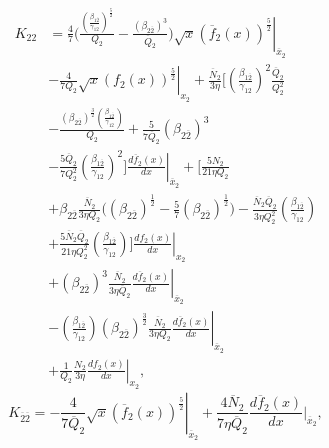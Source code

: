 \documentclass[final,3p,times,twocolumn]{elsarticle}
\begin{document}
           
            \begin{equation}
                \begin{split}
                          K_{22} &= \frac{4}{7} \biggl( \frac{\left(\frac{\beta_{1\overline{2}}}{\gamma_{12}}\right)^\frac{5}{2}}{Q_{2}} - \frac{\left(\beta_{2\overline{2}
                          }\right)^{3}}{\overline{Q}_{2}} \left. \biggr) \sqrt{x}  (\overline{f}_{2}(x))^\frac{5}{2} \right|_{\overline{x}_{2}} \\ & - \left. \frac{4}{7 Q_{2}} \sqrt{x} (f_{2}(x))^\frac{5}{2} \right|_{x_{2}}  + \frac{\overline{N}_{2}}{3 \eta} \biggl[\left(\frac{\beta_{1\overline{2}}}{\gamma_{12}}\right)^{2} \frac{\overline{Q}_{2}}{Q_{2}^{2}} \\ & - \frac{(\beta_{2\overline{2}})^\frac{3}{2} \left(\frac{\beta_{1\overline{2}}}{\gamma_{12}}\right)}{Q_{2}}   + \frac{5}{7 \overline{Q}_{2}} (\beta_{2\overline{2}})^{3}  \\ &  - \frac{5 \overline{Q}_{2}}{7 Q_{2}^{2}} \left(\frac{\beta_{1\overline{2}}}{\gamma_{12}}\right)^{2} \left. \biggr] \frac{d\overline{f}_{2}(x)}{dx} \right|_{\overline{x}_{2}} + \biggl[ \frac{5 N_{2}}{21 \eta Q_{2}} \\ & + \beta_{2\overline{2}} \frac{\overline{N}_{2}}{3 \eta Q_{2}} \biggl( (\beta_{2\overline{2}})^\frac{1}{2}  - \frac{5}{7} (\beta_{2\overline{2}})^\frac{1}{2} \biggr) - \frac{\overline{N}_{2} \overline{Q}_{2}}{3 \eta Q_{2}^{2}}   \left(\frac{\beta_{1\overline{2}}}{\gamma_{12}}\right)  \\ & + \frac{5 \overline{N}_{2} \overline{Q}_{2}}{21 \eta Q_{2}^{2}} \left(\frac{\beta_{1\overline{2}}}{\gamma_{12}}\right) \left. \biggr] \frac{df_{2}(x)}{dx} \right|_{x_{2}} \\ & + (\beta_{2\overline{2}})^3\frac{\overline{N}_{2}}{3 \eta \overline{Q}_{2} } \left. \frac{d\overline{f}_{2}(x)}{dx} \right|_{\overline{x}_{2}}  \\ &- \left. \left(\frac{\beta_{1\overline{2}}}{\gamma_{12}}\right) (\beta_{2\overline{2}})^\frac{3}{2}\frac{\overline{N}_{2}}{3 \eta Q_2} \frac{d \overline{f}_{2}(x)}{dx} \right|_{\overline{x}_{2}} \\ & + \left. \frac{1}{Q_2} \frac{N_2}{3\eta} \frac{df_2(x)}{dx} \right|_{x_2},
                \end{split}
            \label{eqn:k22_caseI}
            \end{equation}
            \begin{equation}
            K_{\overline{2}\overline{2}} = - \left. \frac{4}{7\overline{Q}_{2}} \sqrt{x} (\overline{f}_{2}(x))^\frac{5}{2} \right|_{\overline{x}_{2}} + \frac{4 \overline{N}_{2}}{7 \eta \overline{Q}_{2}} \frac{d\overline{f}_{2}(x)}{dx}\biggr|_{\overline{x}_{2}},
            \label{eqn:k2bar2bar_caseI}
            \end{equation}
\end{document}
